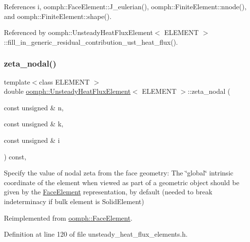 References i, oomph\+::\+Face\+Element\+::\+J\+\_\+eulerian(), oomph\+::\+Finite\+Element\+::nnode(), and oomph\+::\+Finite\+Element\+::shape().



Referenced by oomph\+::\+Unsteady\+Heat\+Flux\+Element$<$ E\+L\+E\+M\+E\+N\+T $>$\+::fill\+\_\+in\+\_\+generic\+\_\+residual\+\_\+contribution\+\_\+ust\+\_\+heat\+\_\+flux().

\mbox{\label{classoomph_1_1UnsteadyHeatFluxElement_a5ee386604e4a99eb2daa220c98f17513}} 
\subsubsection{\texorpdfstring{zeta\+\_\+nodal()}{zeta\_nodal()}}
{\footnotesize\ttfamily template$<$class E\+L\+E\+M\+E\+NT $>$ \\
double \hyperlink{classoomph_1_1UnsteadyHeatFluxElement}{oomph\+::\+Unsteady\+Heat\+Flux\+Element}$<$ E\+L\+E\+M\+E\+NT $>$\+::zeta\+\_\+nodal (\begin{DoxyParamCaption}\item[{const unsigned \&}]{n,  }\item[{const unsigned \&}]{k,  }\item[{const unsigned \&}]{i }\end{DoxyParamCaption}) const\hspace{0.3cm}{\ttfamily [inline]}, {\ttfamily [virtual]}}



Specify the value of nodal zeta from the face geometry\+: The \char`\"{}global\char`\"{} intrinsic coordinate of the element when viewed as part of a geometric object should be given by the \hyperlink{classoomph_1_1FaceElement}{Face\+Element} representation, by default (needed to break indeterminacy if bulk element is Solid\+Element) 



Reimplemented from \hyperlink{classoomph_1_1FaceElement_a58c9f93705c7741f76c8487d152e68a6}{oomph\+::\+Face\+Element}.



Definition at line 120 of file unsteady\+\_\+heat\+\_\+flux\+\_\+elements.\+h.



